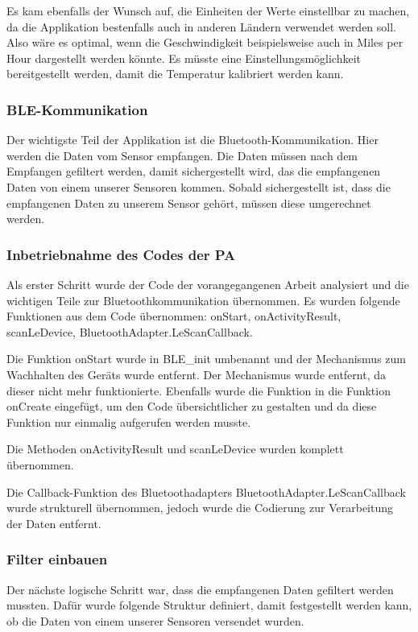 Es kam ebenfalls der Wunsch auf, die Einheiten der Werte einstellbar zu machen, da die Applikation bestenfalls auch in anderen Ländern verwendet werden soll. Also wäre es optimal, wenn die Geschwindigkeit beispielsweise auch in Miles per Hour dargestellt werden könnte. Es müsste eine Einstellungsmöglichkeit bereitgestellt werden, damit die Temperatur kalibriert werden kann.

\subsubsection{BLE-Kommunikation}

Der wichtigste Teil der Applikation ist die Bluetooth-Kommunikation. Hier werden die Daten vom Sensor empfangen. Die Daten müssen nach dem Empfangen gefiltert werden, damit sichergestellt wird, das die empfangenen Daten von einem unserer Sensoren kommen. Sobald sichergestellt ist, dass die empfangenen Daten zu unserem Sensor gehört, müssen diese umgerechnet werden.

\subsubsection{Inbetriebnahme des Codes der PA}

Als erster Schritt wurde der Code der vorangegangenen Arbeit analysiert und die wichtigen Teile zur Bluetoothkommunikation übernommen. Es wurden folgende Funktionen aus dem Code übernommen: onStart, onActivityResult, scanLeDevice, BluetoothAdapter.LeScanCallback.

Die Funktion onStart wurde in BLE\_init umbenannt und der Mechanismus zum Wachhalten des Geräts wurde entfernt. Der Mechanismus wurde entfernt, da dieser nicht mehr funktionierte. Ebenfalls wurde die Funktion in die Funktion onCreate eingefügt, um den Code übersichtlicher zu gestalten und da diese Funktion nur einmalig aufgerufen werden musste.
 
Die Methoden onActivityResult und scanLeDevice wurden komplett übernommen.

Die Callback-Funktion des Bluetoothadapters BluetoothAdapter.LeScanCallback wurde strukturell übernommen, jedoch wurde die Codierung zur Verarbeitung der Daten entfernt.

\subsubsection{Filter einbauen}
Der nächste logische Schritt war, dass die empfangenen Daten gefiltert werden mussten. Dafür wurde folgende Struktur definiert, damit festgestellt werden kann, ob die Daten von einem unserer Sensoren versendet wurden.

